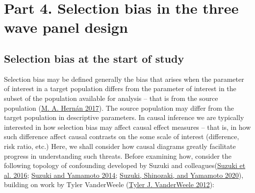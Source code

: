 \documentclass[
  singlecolumn]{report}
\begin{document}
\hypertarget{part-4.-selection-bias-in-the-three-wave-panel-design}{%
\section{Part 4. Selection bias in the three wave panel
design}\label{part-4.-selection-bias-in-the-three-wave-panel-design}}

\hypertarget{selection-bias-at-the-start-of-study}{%
\subsection{Selection bias at the start of
study}\label{selection-bias-at-the-start-of-study}}

Selection bias may be defined generally the bias that arises when the
parameter of interest in a target population differs from the parameter
of interest in the subset of the population available for analysis --
that is from the source population
(\protect\hyperlink{ref-hernuxe1n2017}{M. A. Hernán 2017}). The source
population may differ from the target population in descriptive
parameters. In causal inference we are typically interested in how
selection bias may affect causal effect measures -- that is, in how such
difference affect causal contrasts on the some scale of interest
(difference, risk ratio, etc.) Here, we shall consider how causal
diagrams greatly facilitate progress in understanding such threats.
Before examining how, consider the following topology of confounding
developed by Suzuki and
colleagues(\protect\hyperlink{ref-suzuki2016}{Suzuki et al. 2016};
\protect\hyperlink{ref-suzuki2014}{Suzuki and Yamamoto 2014};
\protect\hyperlink{ref-suzuki2020}{Suzuki, Shinozaki, and Yamamoto
2020}), building on work by Tyler VanderWeele
(\protect\hyperlink{ref-vanderweele2012}{Tyler J. VanderWeele 2012}):
\end{document}
